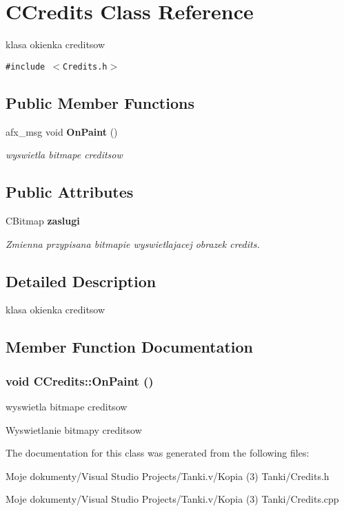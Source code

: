 \section{CCredits Class Reference}
\label{class_c_credits}
klasa okienka creditsow  


{\tt \#include $<$Credits.h$>$}

\subsection*{Public Member Functions}
\begin{CompactItemize}
\item 
afx\_\-msg void {\bf OnPaint} ()
\begin{CompactList}\small\item\em wyswietla bitmape creditsow \item\end{CompactList}\end{CompactItemize}
\subsection*{Public Attributes}
\begin{CompactItemize}
\item 
CBitmap {\bf zaslugi}\label{class_c_credits_e21e75dbe7a50825fff8b18652dde0fb}

\begin{CompactList}\small\item\em Zmienna przypisana bitmapie wyswietlajacej obrazek credits. \item\end{CompactList}\end{CompactItemize}


\subsection{Detailed Description}
klasa okienka creditsow 



\subsection{Member Function Documentation}
\subsubsection{\setlength{\rightskip}{0pt plus 5cm}void CCredits::OnPaint ()}\label{class_c_credits_ffdc903a31fcfabf81fa40694e840bff}


wyswietla bitmape creditsow 



Wyswietlanie bitmapy creditsow 

The documentation for this class was generated from the following files:\begin{CompactItemize}
\item 
Moje dokumenty/Visual Studio Projects/Tanki.v/Kopia (3) Tanki/Credits.h\item 
Moje dokumenty/Visual Studio Projects/Tanki.v/Kopia (3) Tanki/Credits.cpp\end{CompactItemize}
